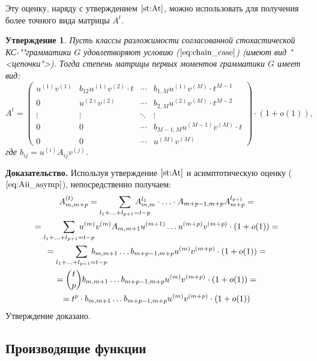 \documentclass[12pt]{article}
\newtheorem{state}{Утверждение}
\begin{document}
Эту оценку, наряду с утверждением $\ref{st:At}$, можно использовать для получения более точного вида матрицы $A^t$.
\begin{state}
\label{st:At_asymp}
	Пусть классы разложимости согласованной стохастической КС-""грамматики $G$ удовлетворяют условию \textup{(}$\ref{eq:chain_case}$\textup{)} (имеют вид "<цепочки">). Тогда степень матрицы первых моментов грамматики $G$ имеет вид:
	\begin{equation}
		A^t = 
		\begin{pmatrix}
			u^{(1)}v^{(1)} & b_{12}u^{(1)}v^{(2)}\cdot t & \cdots & b_{1,M}u^{(1)}v^{(M)}\cdot t^{M-1} \\
			0 & u^{(2)}v^{(2)} & \cdots & b_{2,M}u^{(2)}v^{(M)}\cdot t^{M-2} \\
			\vdots & \vdots & \ddots & \vdots \\
			0 & 0 & \cdots & b_{M-1,M}u^{(M-1)}v^{(M)}\cdot t \\
			0 & 0 & \cdots & u^{(M)}v^{(M)}
		\end{pmatrix}
		\cdot (1+o(1)),
	\end{equation}
	где $b_{ij} = u^{(i)}A_{ij}v^{(j)}$.		
\end{state}
\textbf{Доказательство. }
Используя утверждение $\ref{st:At}$ и асимптотическую оценку ($\ref{eq:Aii_asymp}$), непосредственно получаем:
\begin{multline}
	A_{m,m+p}^{(t)} = \sum_{l_1 + \ldots + l_{p+1} = t-p}\hspace{-20pt} A_{m,m}^{l_1} \cdot \ldots \cdot A_{m+p-1,m+p} A_{m+p}^{l_{p+1}} = \\
	= \sum_{l_1 + \ldots + l_{p+1} = t-p}\hspace{-20pt}u^{(m)}v^{(m)}A_{m,m+1}u^{(m+1)} \ldots u^{(m+p)}v^{(m+p)} \cdot (1+o(1)) = \\
	= \sum_{l_1 + \ldots + l_{p+1} = t-p}\hspace{-20pt}b_{m,m+1} \ldots b_{m+p-1,m+p} u^{(m)}v^{(m+p)} \cdot (1+o(1)) = \\
	= \binom{t}{p} b_{m,m+1} \ldots b_{m+p-1,m+p} u^{(m)}v^{(m+p)} \cdot (1+o(1)) = \\
	= t^p \cdot b_{m,m+1} \ldots b_{m+p-1,m+p} u^{(m)}v^{(m+p)} \cdot (1+o(1))
\end{multline}	
Утверждение доказано.

\subsection{Производящие функции}
\end{document}
